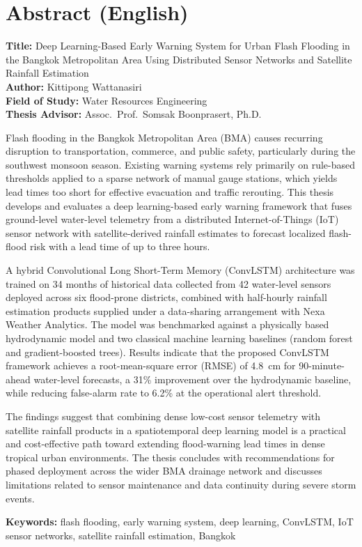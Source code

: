 \chapter*{Abstract (English)}

\noindent\textbf{Title:} Deep Learning-Based Early Warning System for Urban Flash Flooding in the Bangkok Metropolitan Area Using Distributed Sensor Networks and Satellite Rainfall Estimation\\[4pt]
\textbf{Author:} Kittipong Wattanasiri\\[4pt]
\textbf{Field of Study:} Water Resources Engineering\\[4pt]
\textbf{Thesis Advisor:} Assoc.\ Prof.\ Somsak Boonprasert, Ph.D.

\vspace{0.4cm}
\noindent
Flash flooding in the Bangkok Metropolitan Area (BMA) causes recurring disruption to transportation, commerce, and public safety, particularly during the southwest monsoon season. Existing warning systems rely primarily on rule-based thresholds applied to a sparse network of manual gauge stations, which yields lead times too short for effective evacuation and traffic rerouting. This thesis develops and evaluates a deep learning-based early warning framework that fuses ground-level water-level telemetry from a distributed Internet-of-Things (IoT) sensor network with satellite-derived rainfall estimates to forecast localized flash-flood risk with a lead time of up to three hours.

\noindent
A hybrid Convolutional Long Short-Term Memory (ConvLSTM) architecture was trained on 34 months of historical data collected from 42 water-level sensors deployed across six flood-prone districts, combined with half-hourly rainfall estimation products supplied under a data-sharing arrangement with Nexa Weather Analytics. The model was benchmarked against a physically based hydrodynamic model and two classical machine learning baselines (random forest and gradient-boosted trees). Results indicate that the proposed ConvLSTM framework achieves a root-mean-square error (RMSE) of 4.8~cm for 90-minute-ahead water-level forecasts, a 31\% improvement over the hydrodynamic baseline, while reducing false-alarm rate to 6.2\% at the operational alert threshold.

\noindent
The findings suggest that combining dense low-cost sensor telemetry with satellite rainfall products in a spatiotemporal deep learning model is a practical and cost-effective path toward extending flood-warning lead times in dense tropical urban environments. The thesis concludes with recommendations for phased deployment across the wider BMA drainage network and discusses limitations related to sensor maintenance and data continuity during severe storm events.

\vspace{0.4cm}
\noindent\textbf{Keywords:} flash flooding, early warning system, deep learning, ConvLSTM, IoT sensor networks, satellite rainfall estimation, Bangkok

